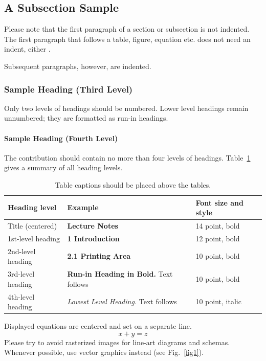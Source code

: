 \documentclass[runningheads]{llncs}
\begin{document}
\subsection{A Subsection Sample}
Please note that the first paragraph of a section or subsection is
not indented. The first paragraph that follows a table, figure,
equation etc. does not need an indent, either \cite{test1}.

Subsequent paragraphs, however, are indented.

\subsubsection{Sample Heading (Third Level)} Only two levels of
headings should be numbered. Lower level headings remain unnumbered;
they are formatted as run-in headings.

\paragraph{Sample Heading (Fourth Level)}
The contribution should contain no more than four levels of
headings. Table~\ref{tab1} gives a summary of all heading levels.

\begin{table}
\caption{Table captions should be placed above the
tables.}\label{tab1}
\begin{tabular}{|l|l|l|}
\hline
Heading level &  Example & Font size and style\\
\hline
Title (centered) &  {\Large\bfseries Lecture Notes} & 14 point, bold\\
1st-level heading &  {\large\bfseries 1 Introduction} & 12 point, bold\\
2nd-level heading & {\bfseries 2.1 Printing Area} & 10 point, bold\\
3rd-level heading & {\bfseries Run-in Heading in Bold.} Text follows & 10 point, bold\\
4th-level heading & {\itshape Lowest Level Heading.} Text follows & 10 point, italic\\
\hline
\end{tabular}
\end{table}


\noindent Displayed equations are centered and set on a separate
line.
\begin{equation}
x + y = z
\end{equation}
Please try to avoid rasterized images for line-art diagrams and
schemas. Whenever possible, use vector graphics instead (see
Fig.~\ref{fig1}).
\end{document}
